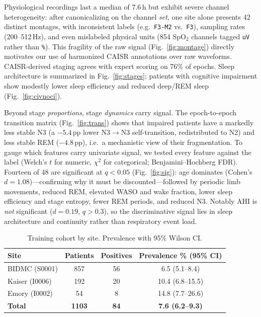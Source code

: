 \documentclass{cinc}
\begin{document}
Physiological recordings last a median of 7.6\,h but exhibit severe channel
heterogeneity: after canonicalizing on the channel \emph{set}, one site alone
presents 42 distinct montages, with inconsistent labels
(e.g.\ \texttt{F3-M2} vs.\ \texttt{F3}), sampling rates (200--512\,Hz), and even
mislabeled physical units (854 SpO$_2$ channels tagged \texttt{uV} rather than
\texttt{\%}). This fragility of the raw signal (Fig.~\ref{fig:montage})
directly motivates our use of harmonized CAISR annotations over raw waveforms.
CAISR-derived staging agrees with expert scoring on 76\% of epochs.
Sleep architecture is summarized in Fig.~\ref{fig:stages}; patients with
cognitive impairment show modestly lower sleep efficiency and reduced deep/REM
sleep (Fig.~\ref{fig:civnoci}).

Beyond stage \emph{proportions}, stage \emph{dynamics} carry signal. The
epoch-to-epoch transition matrix (Fig.~\ref{fig:trans}) shows that impaired
patients have a markedly less stable N3 (a $-5.4$\,pp lower N3$\rightarrow$N3
self-transition, redistributed to N2) and less stable REM ($-4.8$\,pp), i.e.\ a
mechanistic view of their fragmentation. To gauge which features carry
univariate signal, we tested every feature against the label (Welch's $t$ for
numeric, $\chi^2$ for categorical; Benjamini--Hochberg FDR). Fourteen of 48 are
significant at $q<0.05$ (Fig.~\ref{fig:sig}): age dominates
(Cohen's $d\!=\!1.08$)---confirming why it must be discounted---followed by
periodic limb movements, reduced REM, elevated WASO and wake fraction, lower
sleep efficiency and stage entropy, fewer REM periods, and reduced N3. Notably
AHI is \emph{not} significant ($d\!=\!0.19$, $q\!>\!0.3$), so the discriminative
signal lies in sleep architecture and continuity rather than respiratory event
load.

\begin{table}[t]
\centering
\caption{Training cohort by site. Prevalence with 95\% Wilson CI.}
\label{tab:cohort}
\begin{tabular}{lccc}
\toprule
Site & Patients & Positives & Prevalence \% (95\% CI) \\
\midrule
BIDMC (S0001) & 857 & 56 & 6.5 (5.1--8.4) \\
Kaiser (I0006) & 192 & 20 & 10.4 (6.8--15.5) \\
Emory (I0002) & 54 & 8 & 14.8 (7.7--26.6) \\
\midrule
\textbf{Total} & \textbf{1103} & \textbf{84} & \textbf{7.6 (6.2--9.3)} \\
\bottomrule
\end{tabular}
\end{table}
\end{document}
